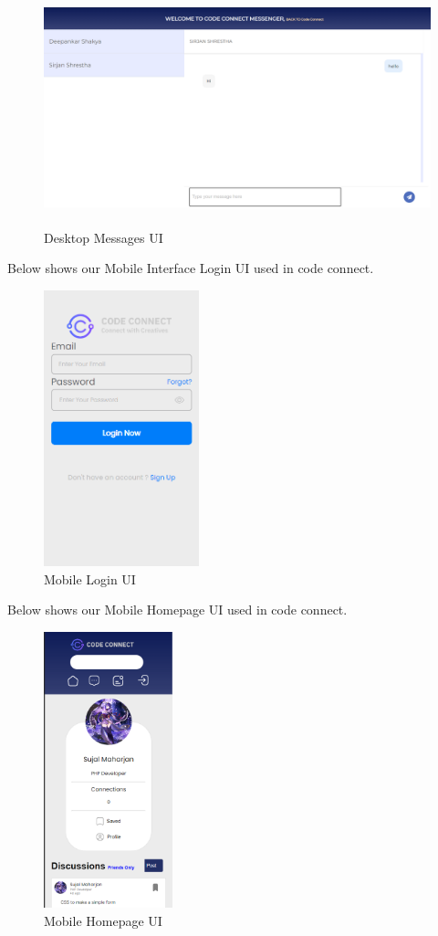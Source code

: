 \begin{figure}[H]
  \centering
  \includegraphics[height = 6.8cm]{Outcome-ss/messenger-full-block.png}
  \caption{Desktop Messages UI}
\end{figure}
\newpage
Below shows our Mobile Interface Login UI used in code connect.
\begin{figure}[H]
  \centering
  \includegraphics[height = 8cm]{ui_diagrams/mobile_login.png}
  \caption{Mobile Login UI}
\end{figure}

Below shows our Mobile Homepage UI used in code connect.
\begin{figure}[H]
  \centering
  \includegraphics[height = 8cm]{Outcome-ss/mobile-homepage.png}
  \caption{Mobile Homepage UI}
\end{figure}

